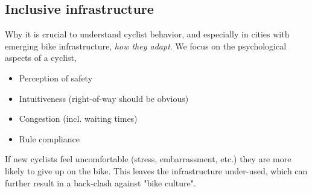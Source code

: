 \color{red}
\subsection{Inclusive infrastructure}
Why it is crucial to understand cyclist behavior, and especially in cities with emerging bike infrastructure, \textit{how they adapt}.
We focus on the psychological aspects of a cyclist,

\begin{itemize}
	\item Perception of safety
	\item Intuitiveness (right-of-way should be obvious)
	\item Congestion (incl. waiting times)
	\item Rule compliance
\end{itemize}

If new cyclists feel uncomfortable (stress, embarrassment, etc.) they are more likely to give up on the bike. This leaves the infrastructure 
under-used, which can further result in a back-clash against "bike culture". 